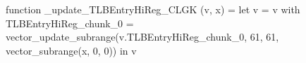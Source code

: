 function _update_TLBEntryHiReg_CLGK (v, x) = let v = { v with TLBEntryHiReg_chunk_0 = vector_update_subrange(v.TLBEntryHiReg_chunk_0, 61, 61, vector_subrange(x, 0, 0)) } in v
